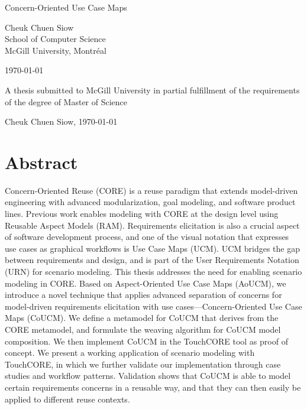 \documentclass[12pt,letterpaper]{report}
\begin{document}
	
	\begin{titlepage}
		\begin{center}
			\vspace*{1in}
			
			\Huge
			Concern-Oriented Use Case Maps
			
			\vfill
			
			\large
			Cheuk Chuen Siow\\
			School of Computer Science\\
			McGill University, Montréal
			
			\vfill
			
			\monthyeardate\today
			
			\vfill
			
			A thesis submitted to McGill University in partial fulfillment of the requirements of the degree of Master of Science
			
			\vfill
			
			\textcopyright{} Cheuk Chuen Siow, \yeardate\today
			
			\vspace*{1in}
		\end{center}
	\end{titlepage}
	
	\clearpage
	\setcounter{page}{2}
	
	\chapter*{Abstract}
	
	Concern-Oriented Reuse (CORE) is a reuse paradigm that extends model-driven engineering with advanced modularization, goal modeling, and software product lines. Previous work enables modeling with CORE at the design level using Reusable Aspect Models (RAM). Requirements elicitation is also a crucial aspect of software development process, and one of the visual notation that expresses use cases as graphical workflows is Use Case Maps (UCM). UCM bridges the gap between requirements and design, and is part of the User Requirements Notation (URN) for scenario modeling. This thesis addresses the need for enabling scenario modeling in CORE. Based on Aspect-Oriented Use Case Maps (AoUCM), we introduce a novel technique that applies advanced separation of concerns for model-driven requirements elicitation with use cases---Concern-Oriented Use Case Maps (CoUCM). We define a metamodel for CoUCM that derives from the CORE metamodel, and formulate the weaving algorithm for CoUCM model composition. We then implement CoUCM in the TouchCORE tool as proof of concept. We present a working application of scenario modeling with TouchCORE, in which we further validate our implementation through case studies and workflow patterns. Validation shows that CoUCM is able to model certain requirements concerns in a reusable way, and that they can then easily be applied to different reuse contexts.
	
\end{document}
